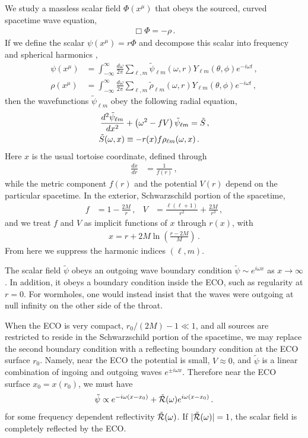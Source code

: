 \begin{refsection}
We study a massless scalar field $\Phi(x^\mu)$ that obeys the sourced, curved spacetime wave equation,
\begin{align}
\Box \Phi = - \rho \,.
\end{align}
If we define the scalar $\psi (x^\mu) = r \Phi$ and decompose this scalar into frequency and spherical harmonics \cite{Casals:2015oaa},
\begin{align}
\psi (x^\mu) &= \int_{-\infty}^{\infty} \frac{d\omega}{2\pi}\sum_{\ell, m} \tilde \psi_{\ell m}(\omega,r) Y_{\ell m}(\theta, \phi)e^{-i\omega t} \,, \\
\rho (x^\mu) &= \int_{-\infty}^{\infty} \frac{d\omega}{2\pi}\sum_{\ell, m} \tilde \rho_{\ell m}(\omega,r) Y_{\ell m}(\theta, \phi)e^{-i\omega t} \,,  
\end{align}
then the wavefunctions $\tilde \psi_{\ell m}$ obey the following radial equation, 
\begin{align}
\label{eq:RW}
\frac{d^2 \tilde \psi_{\ell m}}{dx^2} &+\left(\omega^2-f V \right) \tilde \psi_{\ell m}= \tilde S \,, \\
\tilde S(\omega,x) & \equiv - r(x) f \rho_{\ell m}(\omega,x) \,.
\end{align}
Here $x$ is the usual tortoise coordinate, defined through
\begin{align}
\frac{dx}{dr} & = \frac{1}{f(r)} \,,
\end{align}
while the metric component $f(r)$ and the potential $V(r)$ depend on the particular spacetime.
In the exterior, Schwarzschild portion of the spacetime,
\begin{align}
f & = 1 - \frac{2M}{r} \,, & V & = \frac{\ell(\ell +1)}{r^2} + \frac{2M}{r^3}\,, 
\end{align}
and we treat $f$ and $V$ as implicit functions of $x$ through $r(x)$, with 
\begin{align}
x = r + 2M\ln\left(\frac{r-2M}{M}\right)\,.
\end{align}
From here we suppress the harmonic indices $(\ell,m)$.

The scalar field $\tilde \psi$ obeys an outgoing wave boundary condition $\tilde \psi \sim e^{i\omega x}$ as $x\to \infty$. 
In addition, it obeys a boundary condition inside the ECO, such as regularity at $r=0$. 
For wormholes, one would instead insist that the waves were outgoing at null infinity on the other side of the throat.

When the ECO is very compact, $r_0/(2M)-1 \ll 1$, and all sources are restricted to reside in the Schwarzschild portion of the spacetime, we may replace the second boundary condition with a reflecting boundary condition at the ECO surface $r_0$. Namely, near the ECO the potential is small, $V\approx 0$, and $\tilde \psi$ is a linear combination of ingoing and outgoing waves $e^{\pm i\omega x}$. Therefore near the ECO surface $x_0 = x(r_0)$, we must have
\begin{align}
\label{eq:refBC}
\tilde \psi \propto e^{-i\omega (x-x_0)}+\tilde{\mathcal R}(\omega) e^{i\omega (x-x_0)} \,.
\end{align}
for some frequency dependent reflectivity $\tilde{\mathcal R}(\omega)$. If $|\tilde{\mathcal R}(\omega)|=1$, the scalar field is completely reflected by the ECO.


\end{refsection}
